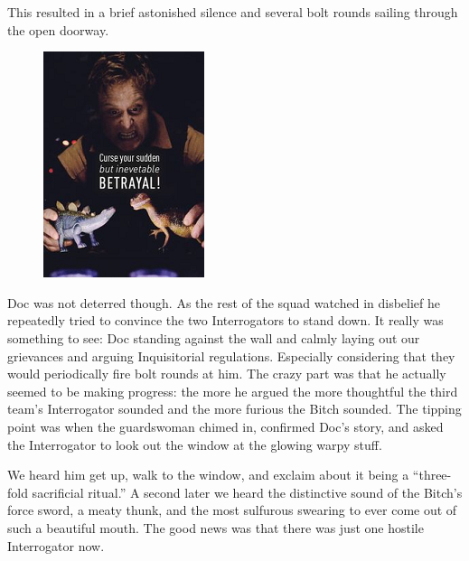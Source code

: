 This resulted in a brief astonished silence and several bolt rounds sailing through the open doorway.

\begin{figure}
	\begin{center}
		\includegraphics[width=\figwidth]{pics/5/34.png}
	\end{center}
\end{figure}
Doc was not deterred though. 
As the rest of the squad watched in disbelief he repeatedly tried to convince the two Interrogators to stand down. 
It really was something to see: 
Doc standing against the wall and calmly laying out our grievances and arguing Inquisitorial regulations. 
Especially considering that they would periodically fire bolt rounds at him. 
The crazy part was that he actually seemed to be making progress: the more he argued the more thoughtful the third team’s Interrogator sounded and the more furious the Bitch sounded. 
The tipping point was when the guardswoman chimed in, confirmed Doc’s story, and asked the Interrogator to look out the window at the glowing warpy stuff.

We heard him get up, walk to the window, and exclaim about it being a “three-fold sacrificial ritual.”
A second later we heard the distinctive sound of the Bitch’s force sword, a meaty thunk, and the most sulfurous swearing to ever come out of such a beautiful mouth. 
The good news was that there was just one hostile Interrogator now.

